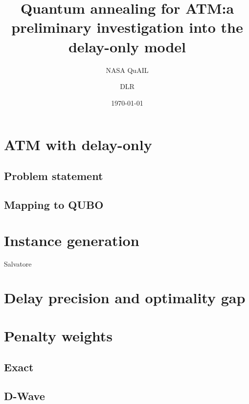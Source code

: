 \documentclass[twocolumn]{article}
\date{\today}
\author{NASA QuAIL \and DLR}
\title{Quantum annealing for ATM:\@ a preliminary investigation into the delay-only model}
\begin{document}
\maketitle

\section{ATM with delay-only}
\subsection{Problem statement}
\subsection{Mapping to QUBO}
\section{Instance generation}
Salvatore
\section{Delay precision and optimality gap}

\section{Penalty weights} 

\subsection{Exact}

\subsection{D-Wave}
\end{document}

